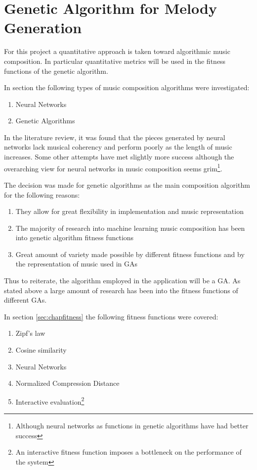 


\chapter{Genetic Algorithm for Melody Generation}

For this project a quantitative approach is taken toward algorithmic music composition. In particular quantitative metrics will be used in the fitness functions of the genetic algorithm.

In section \label{chap:comp_algo} the following types of music composition algorithms were investigated:
\begin{enumerate}
\item Neural Networks
\item Genetic Algorithms
\end{enumerate}
In the literature review, it was found that the pieces generated by neural networks lack musical coherency and perform poorly as the length of music increases. Some other attempts have met slightly more success although the overarching view for neural networks in music composition seems grim\footnote{Although neural networks as functions in genetic algorithms have had better success}.

The decision was made for genetic algorithms as the main composition algorithm for the following reasons:
\begin{enumerate}
\item They allow for great flexibility in implementation and music representation
\item The majority of research into machine learning music composition has been into genetic algorithm fitness functions
\item Great amount of variety made possible by different fitness functions and by the representation of music used in \acp{GA}
\end{enumerate}

Thus to reiterate, the algorithm employed in the application will be a \ac{GA}. As stated above a large amount of research has been into the fitness functions of different \acp{GA}.

In section \ref{sec:chapfitness} the following fitness functions were covered:
\begin{enumerate}
\item Zipf's law
\item Cosine similarity
\item Neural Networks
\item Normalized Compression Distance
\item Interactive evaluation\footnote{An interactive fitness function imposes a bottleneck on the performance of the system}
\end{enumerate}

